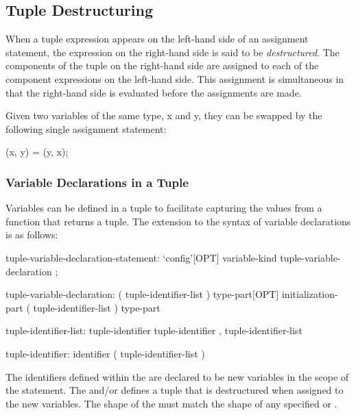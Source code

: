 \subsection{Tuple Destructuring}
\label{Tuple_Destructuring}

When a tuple expression appears on the left-hand side of an assignment
statement, the expression on the right-hand side is said to be {\em
destructured}.  The components of the tuple on the right-hand side are
assigned to each of the component expressions on the left-hand side.
This assignment is simultaneous in that the right-hand side is
evaluated before the assignments are made.
\begin{example}
Given two variables of the same type, x and y, they can be swapped by
the following single assignment statement:
\begin{chapel}
(x, y) = (y, x);
\end{chapel}
\end{example}

\subsubsection{Variable Declarations in a Tuple}
\label{Variable_Declarations_in_a_Tuple}

Variables can be defined in a tuple to facilitate capturing the values
from a function that returns a tuple.  The extension to the syntax of
variable declarations is as follows:
\begin{syntax}
tuple-variable-declaration-statement:
  `config'[OPT] variable-kind tuple-variable-declaration ;

tuple-variable-declaration:
  ( tuple-identifier-list ) type-part[OPT] initialization-part
  ( tuple-identifier-list ) type-part

tuple-identifier-list:
  tuple-identifier
  tuple-identifier , tuple-identifier-list

tuple-identifier:
  identifier
  ( tuple-identifier-list )
\end{syntax}
The identifiers defined within the  are declared
to be new variables in the scope of the statement.  The
 and/or  defines a tuple
that is destructured when assigned to the new variables. The shape of the
 must match the shape of any specified
 or .

